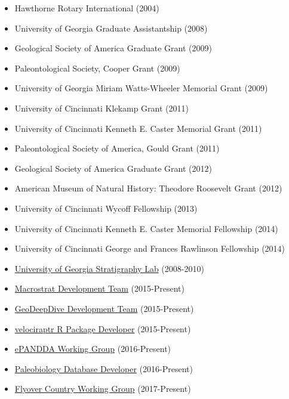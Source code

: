 \documentclass[12pt, a4paper]{awesome-cv}
\begin{document}
\fontsize{10pt}{1em}\bodyfontlight\upshape\color{text}
\begin{itemize}[leftmargin=*]
\item{Hawthorne Rotary International (2004)}
\item{University of Georgia Graduate Assistantship (2008)}
\item{Geological Society of America Graduate Grant (2009)}
\item{Paleontological Society, Cooper Grant (2009)}
\item{University of Georgia Miriam Watts-Wheeler Memorial Grant (2009)}
\item{University of Cincinnati Klekamp Grant (2011)}
\item{University of Cincinnati Kenneth E. Caster Memorial Grant (2011)}
\item{Paleontological Society of America, Gould Grant (2011)}
\item{Geological Society of America Graduate Grant (2012)}
\item{American Museum of Natural History: Theodore Roosevelt Grant (2012)}
\item{University of Cincinnati Wycoff Fellowship (2013)}
\item{University of Cincinnati Kenneth E. Caster Memorial Fellowship (2014)}
\item{University of Cincinnati George and Frances Rawlinson Fellowship (2014)}
\end{itemize}

\fontsize{10pt}{1em}\bodyfontlight\upshape\color{text}
\begin{itemize}[leftmargin=*]
\item{\href{http://strata.uga.edu/}{University of Georgia Stratigraphy Lab} (2008-2010)}
\item{\href{https://macrostrat.org/}{Macrostrat Development Team} (2015-Present)}
\item{\href{https://geodeepdive.org/}{GeoDeepDive Development Team} (2015-Present)}
\item{\href{https://cran.r-project.org/web/packages/velociraptr/index.html}{velociraptr R Package Developer} (2015-Present)}
\item{\href{https://steppe.org/epandda/}{ePANDDA Working Group} (2016-Present)}
\item{\href{https://paleobiodb.org/#/people}{Paleobiology Database Developer} (2016-Present)}
\item{\href{http://fc.umn.edu/}{Flyover Country Working Group} (2017-Present)}
\end{itemize}
\end{document}
